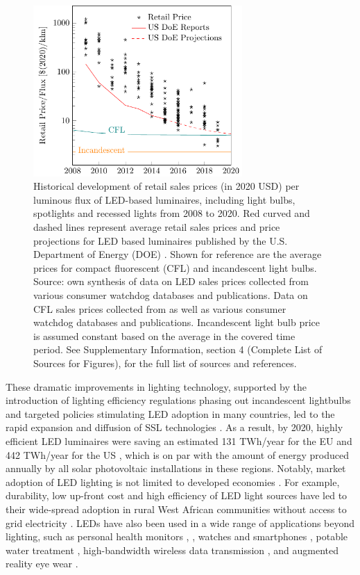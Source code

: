 \documentclass[twoside,twocolumn,9pt]{article}
\begin{document}
\begin{figure}
\centering
  \includegraphics[height=6.5cm]{2_SSL_EES/article/figures/cost_lamp_small.pdf}
  \caption{Historical development of retail sales prices (in 2020 USD) per luminous flux of LED-based luminaires, including light bulbs, spotlights and recessed lights from 2008 to 2020. Red curved and dashed lines represent average retail sales prices and price projections for LED based luminaires published by the U.S. Department of Energy (DOE) \cite{council2013assessment}. Shown for reference are the average prices for compact fluorescent (CFL) and incandescent light bulbs. Source: own synthesis of data on LED sales prices collected from various consumer watchdog databases and publications. Data on CFL sales prices collected from \cite{eger2018origin} as well as various consumer watchdog databases and publications. Incandescent light bulb price is assumed constant based on the average in the covered time period. See Supplementary Information, section 4 (Complete List of Sources for Figures), for the full list of sources and references.}
  \label{fgr:cost_lamp_small}
\end{figure}

These  dramatic improvements in lighting technology, supported by the introduction of lighting efficiency regulations phasing out incandescent lightbulbs and targeted policies stimulating LED adoption in many countries, led to the rapid expansion and diffusion of SSL technologies  \cite{weinold2020long}\cite{Mills2014}\cite{Stegmaier2021}\cite{grubb2021new}. As a result, by 2020, highly efficient LED luminaires were saving an estimated 131 TWh/year for the EU \cite{eu2019impactass} and 442 TWh/year for the US \cite{guidehouse2020adoption}, which is on par with the amount of energy produced annually by all solar photovoltaic installations in these regions. Notably, market adoption of LED lighting is not limited to developed economies \cite{Kamat2020}. For example, durability, low up-front cost and high efficiency of LED light sources have led to their wide-spread adoption in rural West African communities without access to grid electricity \cite{Bensch2017}. LEDs have also been used in a wide range of applications beyond lighting, such as personal health monitors \cite{o2019optical}, \cite{Wyatt2020}, watches and smartphones \cite{Bai2017}, potable water treatment \cite{Lui2014}, high-bandwidth wireless data transmission \cite{Haas2016}, and augmented reality eye wear \cite{Lee2016}. 
\end{document}
